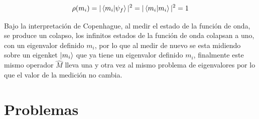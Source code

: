 \documentclass[12pt,a4paper]{article}
\begin{document}
\begin{enumerate}[label=\alph*)]
\[
\rho(m_{i}) = |\braket{m_{i}|\psi_{f}}|^2 = |\braket{m_{i}|m_{i}}|^{2} = 1
\]

Bajo la interpretación de Copenhague, al medir el estado de la función de onda, se produce un colapso, los infinitos estados de la función de onda colapsan a uno, con un eigenvalor definido $ m_{i} $, por lo que al medir de nuevo se esta midiendo sobre un eigenket $ \ket{m_{i}} $ que ya tiene un eigenvalor definido $ m_{i} $, finalmente este mismo operador $ \hat{M} $ lleva una y otra vez al mismo problema de eigenvalores por lo que el valor de la medición no cambia.

\end{enumerate}

\section*{Problemas}
\end{document}
